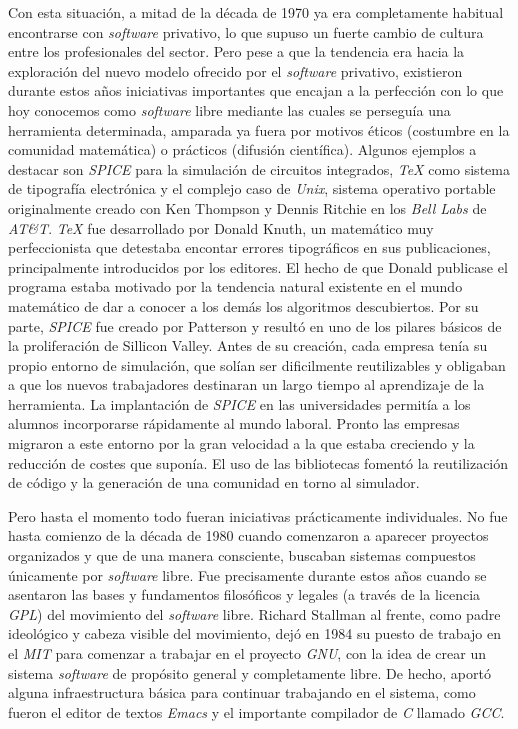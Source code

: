 Con esta situación, a mitad de la década de 1970 ya era completamente habitual
encontrarse con \textit{software} privativo, lo que supuso un fuerte cambio de
cultura entre los profesionales del sector. Pero pese a que la tendencia era
hacia la exploración del nuevo modelo ofrecido por el \textit{software}
privativo, existieron durante estos años iniciativas importantes que encajan a
la perfección con lo que hoy conocemos como \textit{software} libre mediante las
cuales se perseguía una herramienta determinada, amparada ya fuera por motivos
éticos (costumbre en la comunidad matemática) o prácticos (difusión científica).
Algunos ejemplos a destacar son \textit{SPICE} para la simulación de circuitos
integrados, \textit{TeX} como sistema de tipografía electrónica y el complejo
caso de \textit{Unix}, sistema operativo portable originalmente creado con Ken
Thompson y Dennis Ritchie en los \textit{Bell Labs} de \textit{AT\&T}.
\textit{TeX} fue desarrollado por Donald Knuth, un matemático muy
perfeccionista que detestaba encontar errores tipográficos en sus
publicaciones, principalmente introducidos por los editores. El hecho
de que Donald publicase el programa estaba motivado por la tendencia
natural existente en el mundo matemático de dar a conocer a los demás
los algoritmos descubiertos. Por su parte, \textit{SPICE} fue creado
por Patterson y resultó en uno de los pilares básicos de la
proliferación de Sillicon Valley. Antes de su creación, cada empresa
tenía su propio entorno de simulación, que solían ser dificilmente
reutilizables y obligaban a que los nuevos trabajadores destinaran un
largo tiempo al aprendizaje de la herramienta. La implantación de
\textit{SPICE} en las universidades permitía a los alumnos
incorporarse rápidamente al mundo laboral. Pronto las empresas
migraron a este entorno por la gran velocidad a la que estaba
creciendo y la reducción de costes que suponía. El uso de las
bibliotecas fomentó la reutilización de código y la generación de una
comunidad en torno al simulador.

Pero hasta el momento todo fueran iniciativas prácticamente individuales. No
fue hasta comienzo de la década de 1980 cuando comenzaron a aparecer proyectos
organizados y que de una manera consciente, buscaban sistemas compuestos
únicamente por \textit{software} libre. Fue precisamente durante estos años
cuando se asentaron las bases y fundamentos filosóficos y legales (a través de
la licencia \textit{GPL}) del movimiento del \textit{software} libre. Richard
Stallman al frente, como padre ideológico y cabeza visible del movimiento, dejó
en 1984 su puesto de trabajo en el \textit{MIT} para comenzar a trabajar en el
proyecto \textit{GNU}, con la idea de crear un sistema \textit{software} de
propósito general y completamente libre. De hecho, aportó alguna infraestructura
básica para continuar trabajando en el sistema, como fueron el editor de textos
\textit{Emacs} y el importante compilador de \textit{C} llamado \textit{GCC}.


